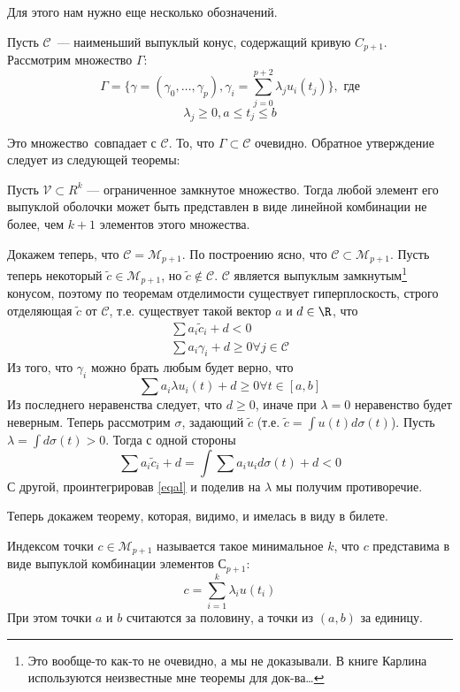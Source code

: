 Для этого нам нужно еще несколько обозначений.

Пусть $\mathcal{C}$ — наименьший выпуклый конус, содержащий кривую $C_{p+1}$. Рассмотрим множество $\Gamma$:
$$ \Gamma = \{ \gamma = (\gamma_0, …, \gamma_p), \gamma_i = \sum \limits_{j=0}^{p+2} \lambda_j u_i(t_j) \}, \text{ где}$$
$$ \lambda_j \geq 0, a \leq t_j \leq b$$

Это множество совпадает с $\mathcal{C}$. То, что $\Gamma \subset \mathcal{C}$ очевидно. Обратное утверждение следует из следующей теоремы:
\begin{thm}[Каратеодори]
Пусть $\mathcal{V} \subset R^{k}$ — ограниченное замкнутое множество. Тогда любой элемент его выпуклой оболочки может быть представлен в виде линейной комбинации не более, чем $k+1$ элементов этого множества.
\end{thm}

Докажем теперь, что $\mathcal{C} = \mathcal{M}_{p+1}$. По построению ясно, что $\mathcal{C} \subset \mathcal{M}_{p+1}$. Пусть теперь некоторый $\tilde{c} \in \mathcal{M}_{p+1}$, но $\tilde{c} \notin \mathcal{C}$. $\mathcal{C}$ является выпуклым замкнутым\footnote{Это вообще-то как-то не очевидно, а мы не доказывали. В книге Карлина используются неизвестные мне теоремы для док-ва…} конусом, поэтому по теоремам отделимости существует гиперплоскость, строго отделяющая $\tilde{c}$ от $\mathcal{C}$, т.е. существует такой вектор $a$ и $d \in \R$, что 
\begin{align}
\sum a_i \tilde{c}_i + d < 0 \\
\sum a_i \gamma_i + d \geq 0 \forall j \in \mathcal{C}
\end{align}
Из того, что $\gamma_i$ можно брать любым будет верно, что 
\begin{equation}
\label{eqal}
\sum a_i \lambda u_i(t) + d \geq 0 \forall t \in [a,b]
\end{equation}
Из последнего неравенства следует, что $d\geq 0$, иначе при $\lambda = 0$ неравенство будет неверным. 
Теперь рассмотрим $\sigma$, задающий $\tilde{c}$ (т.е. $\tilde{c} = \int u(t) d\sigma(t)$).  Пусть 
$\lambda = \int d\sigma(t) > 0$. Тогда с одной стороны
$$\sum a_i \tilde{c}_i + d = \int \sum a_i u_i d\sigma(t) + d  < 0$$
С другой, проинтегрировав \eqref{eqal} и поделив на $\lambda$ мы получим противоречие.
 

Теперь докажем теорему, которая, видимо, и имелась в виду в билете.
\begin{dfn}
Индексом точки $c \in \mathcal{M}_{p+1}$ называется такое минимальное $k$, что $c$ представима в виде выпуклой комбинации элементов $С_{p+1}$:
\begin{equation}
c = \sum \limits_{i=1}^{k} \lambda_i u(t_i)
\end{equation}
При этом точки $a$ и $b$ считаются за половину, а точки из $(a,b)$ за единицу.
\end{dfn}

